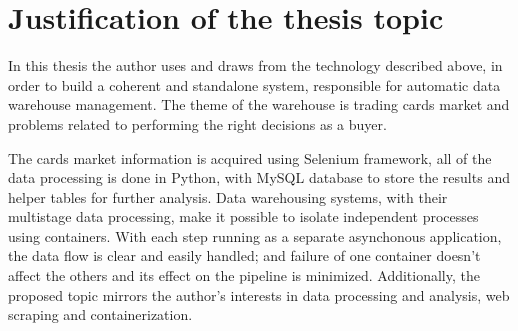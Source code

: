 \section{Justification of the thesis topic}
In this thesis the author uses and draws from the technology described above, in order to build a coherent and standalone system, responsible for automatic data warehouse management. The theme of the warehouse is trading cards market and problems related to performing the right decisions as a buyer. \par
The cards market information is acquired using Selenium framework, all of the data processing is done in Python, with MySQL database to store the results and helper tables for further analysis. Data warehousing systems, with their multistage data processing, make it possible to isolate independent processes using containers. With each step running as a separate asynchonous application, the data flow is clear and easily handled; and failure of one container doesn't affect the others and its effect on the pipeline is minimized. Additionally, the proposed topic mirrors the author's interests in data processing and analysis, web scraping and containerization.
